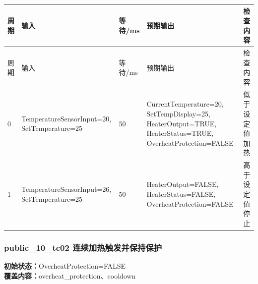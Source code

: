 \begin{longtable}{L{1.0cm}L{4.7cm}L{1.4cm}L{4.0cm}L{2.1cm}}

\toprule

周期 & 输入 & 等待/ms & 预期输出 & 检查内容\\

\midrule

\endfirsthead

\toprule

周期 & 输入 & 等待/ms & 预期输出 & 检查内容\\

\midrule

\endhead

0 & TemperatureSensorInput=20, SetTemperature=25 & 50 & CurrentTemperature=20, SetTempDisplay=25, HeaterOutput=TRUE, HeaterStatus=TRUE, OverheatProtection=FALSE & 低于设定值加热\\

1 & TemperatureSensorInput=26, SetTemperature=25 & 50 & HeaterOutput=FALSE, HeaterStatus=FALSE, OverheatProtection=FALSE & 高于设定值停止\\

\bottomrule

\end{longtable}

\subsubsection{{\ttfamily public\_10\_tc02} 连续加热触发并保持保护}

\noindent\textbf{初始状态：}OverheatProtection=FALSE\\

\textbf{覆盖内容：}overheat\_protection、cooldown

